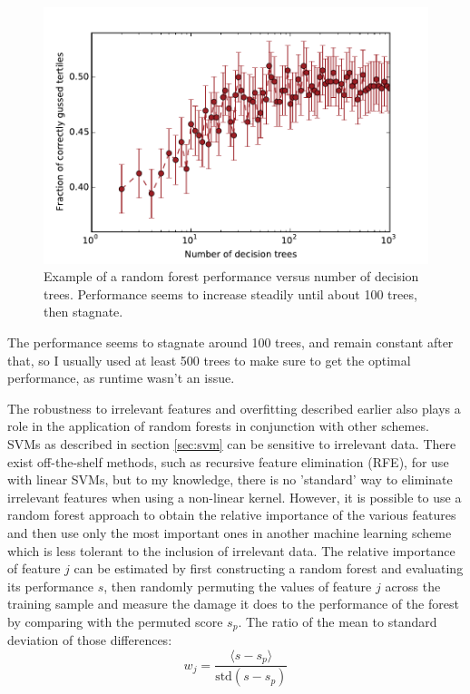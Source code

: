 \begin{figure}
	\includegraphics[width=\figwidth]{pics/ml/determine_ntrees.pdf}
	\caption{Example of a random forest performance versus number of decision trees. Performance seems to increase steadily until about 100 trees, then stagnate.}
	\label{fig:determine_ntrees}
\end{figure}
The performance seems to stagnate around 100 trees, and remain constant after that, so I usually used at least 500 trees to make sure to get the optimal performance, as runtime wasn't an issue.

The robustness to irrelevant features and overfitting described earlier also plays a role in the application of random forests in conjunction with other schemes. SVMs as described in section \ref{sec:svm} can be sensitive to irrelevant data\cite{Pietersma2011}. There exist off-the-shelf methods, such as recursive feature elimination (RFE)\cite{Guyon2002}, for use with linear SVMs, but to my knowledge, there is no 'standard' way to eliminate irrelevant features when using a non-linear kernel. However, it is possible to use a random forest approach to obtain the relative importance of the various features and then use only the most important ones in another machine learning scheme which is less tolerant to the inclusion of irrelevant data. The relative importance of feature $j$ can be estimated  by first constructing a random forest and evaluating its performance $s$, then randomly permuting the values of feature $j$ across the training sample and measure the damage it does to the performance of the forest by comparing with the permuted score $s_p$. The ratio of the mean to standard deviation of those differences:
\begin{equation}
	w_j = \frac{\langle s-s_p \rangle}{\mathrm{std}(s - s_p)}
\end{equation}	


